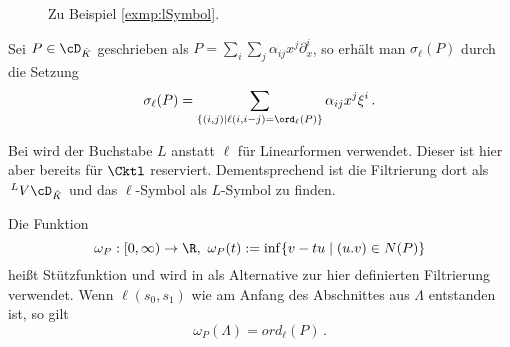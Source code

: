 \begin{bsp}
\begin{figure}[H]
\begin{minipage}[hbt]{0,32\textwidth}
\begin{center}
\begin{tikzpicture}[scale=1.5,descr/.style={fill=white,inner sep=2.5pt}]
      \end{tikzpicture}
    \end{center}
  \end{minipage}
  \begin{minipage}[hbt]{0,32\textwidth}
    \begin{center}
    \end{center}
  \end{minipage}
  \begin{minipage}[hbt]{0,32\textwidth}
    \begin{center}
    \end{center}
  \end{minipage}
  \caption{Zu Beispiel \ref{exmp:lSymbol}.}
  \label{fig:lSymbol}
\end{figure}
\end{bsp}
\begin{bem}
Sei $P\in \cD_{\hat K}$ geschrieben als
$P=\sum_i\sum_j\alpha_{ij}x^j\partial_x^i$, so erhält man $\sigma_\ell(P)$
durch die Setzung
\[
\sigma_\ell(P)=\sum_{\{(i,j)\mid\ell(i,i-j)=\ord_\ell(P)\}}\alpha_{ij}x^j\xi^i \,.
\]
\end{bem}

\begin{bem}
Bei \cite{sabbah_cimpa90} wird der Buchstabe $L$ anstatt $\ell$ für
Linearformen verwendet. Dieser ist hier aber bereits für $\Cktl$ reserviert.
Dementsprechend ist die Filtrierung dort als $\,^L V\cD_{\hat K}$ und das
$\ell$-Symbol als $L$-Symbol zu finden.
\end{bem}
\begin{bem}[Stützfunktion]
Die Funktion
\[
\omega_P:[0,\infty)\rightarrow\R,~\omega_P(t):=\inf\{v-tu \mid (u.v) \in N(P)\}
\]
heißt Stützfunktion und wird in \cite{ZulaBarbara} als Alternative zur hier
definierten Filtrierung verwendet.
Wenn $\ell(s_0,s_1)$ wie am Anfang des Abschnittes aus $\Lambda$ entstanden
ist, so gilt
\[
\omega_P(\Lambda)=ord_\ell(P) \,.
\]
\end{bem}

